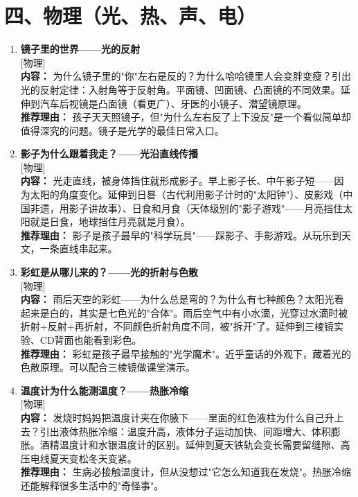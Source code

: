 \documentclass[a4paper,12pt]{ctexart}
\newcommand{\tagphysics}{\textcolor{physics}{\small [物理]}}
\begin{document}
\section*{\textcolor{orange!80!black}{四、物理（光、热、声、电）}}

\begin{enumerate}

\item[\textbf{第16课}] \textbf{镜子里的世界——光的反射} \\
\tagphysics \\
\textbf{内容：} 为什么镜子里的"你"左右是反的？为什么哈哈镜里人会变胖变瘦？引出光的反射定律：入射角等于反射角。平面镜、凹面镜、凸面镜的不同效果。延伸到汽车后视镜是凸面镜（看更广）、牙医的小镜子、潜望镜原理。\\
\textbf{推荐理由：} 孩子天天照镜子，但"为什么左右反了上下没反"是一个看似简单却值得深究的问题。镜子是光学的最佳日常入口。

\item[\textbf{第17课}] \textbf{影子为什么跟着我走？——光沿直线传播} \\
\tagphysics \\
\textbf{内容：} 光走直线，被身体挡住就形成影子。早上影子长、中午影子短——因为太阳的角度变化。延伸到日晷（古代利用影子计时的"太阳钟"）、皮影戏（中国非遗，用影子讲故事）、日食和月食（天体级别的"影子游戏"——月亮挡住太阳就是日食，地球挡住月亮就是月食）。\\
\textbf{推荐理由：} 影子是孩子最早的"科学玩具"——踩影子、手影游戏。从玩乐到天文，一条直线串起来。

\item[\textbf{第18课}] \textbf{彩虹是从哪儿来的？——光的折射与色散} \\
\tagphysics \\
\textbf{内容：} 雨后天空的彩虹——为什么总是弯的？为什么有七种颜色？太阳光看起来是白的，其实是七色光的"合体"。雨后空气中有小水滴，光穿过水滴时被折射+反射+再折射，不同颜色折射角度不同，被"拆开"了。延伸到三棱镜实验、CD背面也能看到彩色。\\
\textbf{推荐理由：} 彩虹是孩子最早接触的"光学魔术"。近乎童话的外观下，藏着光的色散原理。可以配合三棱镜做课堂演示。

\item[\textbf{第19课}] \textbf{温度计为什么能测温度？——热胀冷缩} \\
\tagphysics \\
\textbf{内容：} 发烧时妈妈把温度计夹在你腋下——里面的红色液柱为什么自己升上去？引出液体热胀冷缩：温度升高，液体分子运动加快、间距增大、体积膨胀。酒精温度计和水银温度计的区别。延伸到夏天铁轨会变长需要留缝隙、高压电线夏天变松冬天变紧。\\
\textbf{推荐理由：} 生病必接触温度计，但从没想过"它怎么知道我在发烧"。热胀冷缩还能解释很多生活中的"奇怪事"。


\end{enumerate}
\end{document}
